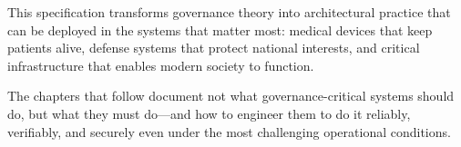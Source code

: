 This specification transforms governance theory into architectural practice that can be deployed in the systems that matter most: medical devices that keep patients alive, defense systems that protect national interests, and critical infrastructure that enables modern society to function.

The chapters that follow document not what governance-critical systems should do, but what they must do—and how to engineer them to do it reliably, verifiably, and securely even under the most challenging operational conditions.